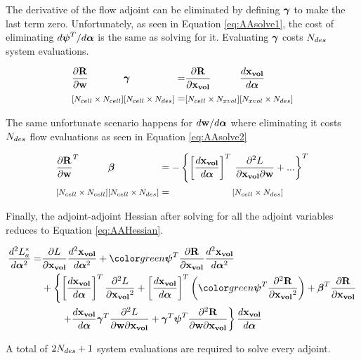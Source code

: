 \documentclass[letterpaper,12pt,]{article}
\begin{document}
The derivative of the flow adjoint can be eliminated by defining $\boldsymbol{\gamma}$ to make the last term zero.
Unfortunately, as seen in Equation \ref{eq:AAsolve1}, the cost of eliminating $d\boldsymbol{\psi}^T/d\boldsymbol{\alpha}$ is the same as solving for it.
Evaluating $\boldsymbol{\gamma}$ costs $N_{des}$ system evaluations.

\begin{equation}
\begin{alignedat}{5}
	&\dfrac{\partial\mathbf{R}}{\partial\mathbf{w}}
	&&\boldsymbol{\gamma}
	&&=
	&&\dfrac{\partial\mathbf{R}}{\partial\mathbf{x_{vol}}}
	&&\dfrac{d\mathbf{x_{vol}}}{d\boldsymbol{\alpha}}
	\\
	& \text{\footnotesize$\left[ N_{cell} \times N_{cell} \right]$}
	&&\text{\footnotesize$\left[ N_{cell} \times N_{des} \right]$}
	&&=
	&&\text{\footnotesize$\left[ N_{cell} \times N_{xvol} \right]$}
	&&\text{\footnotesize$\left[ N_{xvol} \times N_{des} \right]$}
\label{eq:AAsolve1}
\end{alignedat}
\end{equation}

The same unfortunate scenario happens for $d\mathbf{w}/d\boldsymbol{\alpha}$ where eliminating it costs $N_{des}$ flow evaluations as seen in Equation \ref{eq:AAsolve2}

\begin{equation}
\begin{alignedat}{5}
	&\dfrac{\partial\mathbf{R}}{\partial\mathbf{w}}^T
	&&\boldsymbol{\beta}
	&&= -
	\left\{
	\left[\dfrac{d\mathbf{x_{vol}}}{d\boldsymbol{\alpha}}\right]^{T}
	\right. && \left.
	\dfrac{\partial^2L}{\partial\mathbf{x_{vol}} \partial\mathbf{w}}
	+ ...
	\right\}^T
	\\
	& \text{\footnotesize$\left[ N_{cell} \times N_{cell} \right]$}
	&&\text{\footnotesize$\left[ N_{cell} \times N_{des} \right]$}
	&&=
	&&\text{\footnotesize$\left[ N_{cell} \times N_{des} \right]$}
\label{eq:AAsolve2}
\end{alignedat}
\end{equation}

Finally, the adjoint-adjoint Hessian after solving for all the adjoint variables reduces to Equation \ref{eq:AAHessian}.

\begin{equation}
\begin{split}
	\DDt{L_a^*}{\balfa} = 
	&
	\del{L}{\xvol}
	\DDt{\xvol}{\balfa}
	+
	\green{\bpsi}^T
	\del{\bR}{\xvol}
	\DDt{\xvol}{\balfa}
	\\&
	+
	\left\{
		\trans{\Dt{\xvol}{\balfa}}
		\ddel{L}{\xvol}
		+
		\trans{\Dt{\xvol}{\balfa}}
		\left(
		\green{\bpsi}^T
		\ddel{\bR}{\xvol}
		\right)
		+
		\bbeta^T
			\del{\bR}{\xvol}
		\right.\\&\left. \quad\quad
		+
		\Dt{\xvol}{\balfa}
		\bgam^T
		\ddelm{L}{\bw}{\xvol}
		+
		\bgam^T
		\bpsi^T \ddelm{\bR}{\bw}{\xvol}
	\right\}
	\Dt{\xvol}{\balfa}
\label{eq:AAHessian}
\end{split}
\end{equation}

A total of $2N_{des} + 1$ system evaluations are required to solve every adjoint.
\end{document}
